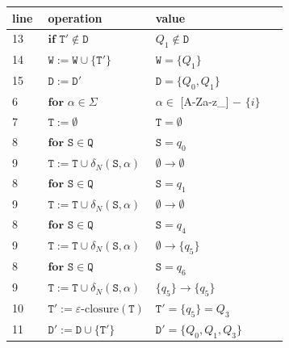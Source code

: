 \documentclass{article}
\begin{document}
\begin{minipage}[c]{0.59\textwidth}
\scriptsize
\setlength{\tabcolsep}{2pt}
\renewcommand{\arraystretch}{1.45}
\begin{tabular}{@{}p{0.13\linewidth}|p{0.39\linewidth}|p{}@{}}
\textbf{line} & \textbf{operation} & \textbf{value} \\
\hline
13 & \(\textbf{if }\mathtt{T}'\notin\mathtt{D}\) & \(Q_1\notin\mathtt{D}\) \\
14 & \(\mathtt{W} := \mathtt{W}\cup\{\mathtt{T}'\}\) & \(\mathtt{W}=\{Q_1\}\) \\
15 & \(\mathtt{D} := \mathtt{D}'\) & \(\mathtt{D}=\{Q_0,Q_1\}\) \\
6 & \(\textbf{for }\alpha\in\Sigma\) & \(\alpha\in\) [A-Za-z\_] $-$ $\{i\}$ \\
7 & \(\mathtt{T} := \emptyset\) & \(\mathtt{T}=\emptyset\) \\
8 & \(\textbf{for }\mathtt{S}\in\mathtt{Q}\) & \(\mathtt{S}=q_0\) \\
9 & \(\mathtt{T} := \mathtt{T}\cup\delta_N(\mathtt{S},\alpha)\) & \(\emptyset\to\emptyset\) \\
8 & \(\textbf{for }\mathtt{S}\in\mathtt{Q}\) & \(\mathtt{S}=q_1\) \\
9 & \(\mathtt{T} := \mathtt{T}\cup\delta_N(\mathtt{S},\alpha)\) & \(\emptyset\to\emptyset\) \\
8 & \(\textbf{for }\mathtt{S}\in\mathtt{Q}\) & \(\mathtt{S}=q_4\) \\
9 & \(\mathtt{T} := \mathtt{T}\cup\delta_N(\mathtt{S},\alpha)\) & \(\emptyset\to\{q_5\}\) \\
8 & \(\textbf{for }\mathtt{S}\in\mathtt{Q}\) & \(\mathtt{S}=q_6\) \\
9 & \(\mathtt{T} := \mathtt{T}\cup\delta_N(\mathtt{S},\alpha)\) & \(\{q_5\}\to\{q_5\}\) \\
10 & \(\mathtt{T}' := \varepsilon\mbox{-closure}(\mathtt{T})\) & \(\mathtt{T}'=\{q_5\}=Q_3\) \\
11 & \(\mathtt{D}' := \mathtt{D}\cup\{\mathtt{T}'\}\) & \(\mathtt{D}'=\{Q_0,Q_1,Q_3\}\) \\
\end{tabular}
\end{minipage}\hfill%
\begin{minipage}[c]{0.39\textwidth}
\centering
{}
\end{minipage}
\end{document}
